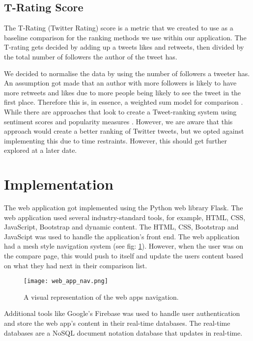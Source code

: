 	\subsection{T-Rating Score}
		The T-Rating (Twitter Rating) score is a metric that we created to use as a baseline comparison for the ranking methods we use within our application. The T-rating gets decided by adding up a tweets likes and retweets, then divided by the total number of followers the author of the tweet has. 
		
		We decided to normalise the data by using the number of followers a tweeter has. An assumption got made that an author with more followers is likely to have more retweets and likes due to more people being likely to see the tweet in the first place. Therefore this is, in essence, a weighted sum model for comparison \cite{churchman1954approximate}. While there are approaches that look to create a Tweet-ranking system using sentiment scores and popularity measures \cite{aleidi2019tweet}. However, we are aware that this approach would create a better ranking of Twitter tweets, but we opted against implementing this due to time restraints. However, this should get further explored at a later date.
	
	
	\section{Implementation}
	
	The web application got implemented using the Python web library Flask. The web application used several industry-standard tools, for example, HTML, CSS, JavaScript, Bootstrap and dynamic content. The HTML, CSS, Bootstrap and JavaScipt was used to handle the application's front end. The web application had a mesh style navigation system (see fig: \ref{fig:web_app_nav}). However, when the user was on the compare page, this would push to itself and update the users content based on what they had next in their comparison list.
	
	\begin{figure}[t]
		\centering
		\texttt{[image: web\_app\_nav.png]}
		\caption{A visual representation of the web apps navigation.}
		\label{fig:web_app_nav}
		
	\end{figure}
	
	Additional tools like Google's Firebase was used to handle user authentication and store the web app's content in their real-time databases. The real-time databases are a NoSQL document notation database that updates in real-time. 
	
